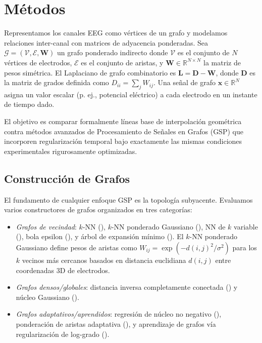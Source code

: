 \section{Métodos}

Representamos los canales EEG como vértices de un grafo y modelamos relaciones inter-canal con matrices de adyacencia ponderadas. Sea $\mathcal{G} = (\mathcal{V}, \mathcal{E}, \mathbf{W})$ un grafo ponderado indirecto donde $\mathcal{V}$ es el conjunto de $N$ vértices de electrodos, $\mathcal{E}$ es el conjunto de aristas, y $\mathbf{W} \in \mathbb{R}^{N \times N}$ la matriz de pesos simétrica. El Laplaciano de grafo combinatorio es $\mathbf{L} = \mathbf{D} - \mathbf{W}$, donde $\mathbf{D}$ es la matriz de grados definida como $D_{ii} = \sum_j W_{ij}$. Una señal de grafo $\mathbf{x} \in \mathbb{R}^{N}$ asigna un valor escalar (p. ej., potencial eléctrico) a cada electrodo en un instante de tiempo dado.

El objetivo es comparar formalmente líneas base de interpolación geométrica contra métodos avanzados de Procesamiento de Señales en Grafos (GSP) que incorporen regularización temporal bajo exactamente las mismas condiciones experimentales rigurosamente optimizadas.

\subsection{Construcción de Grafos}
El fundamento de cualquier enfoque GSP es la topología subyacente. Evaluamos varios constructores de grafos organizados en tres categorías:
\begin{itemize}
\item \emph{Grafos de vecindad}: $k$-NN (), $k$-NN ponderado Gaussiano (), NN de $k$ variable (), bola epsilon (), y árbol de expansión mínimo (). El $k$-NN ponderado Gaussiano define pesos de aristas como $W_{ij} = \exp(-d(i,j)^2 / \sigma^2)$ para los $k$ vecinos más cercanos basados en distancia euclidiana $d(i,j)$ entre coordenadas 3D de electrodos.
\item \emph{Grafos densos/globales}: distancia inversa completamente conectada () y núcleo Gaussiano ().
\item \emph{Grafos adaptativos/aprendidos}: regresión de núcleo no negativo \cite{shekkizhar2020} (), ponderación de aristas adaptativa \cite{kalofolias2016} (), y aprendizaje de grafos vía regularización de log-grado \cite{kalofolias2016} ().
\end{itemize}

